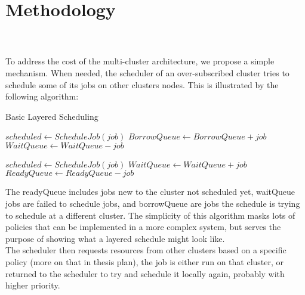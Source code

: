 \section{Methodology}

\\ \\ To address the cost of the multi-cluster architecture, we propose a simple mechanism. When needed, 
the scheduler of an over-subscribed cluster tries to schedule some of its jobs on other clusters nodes. 
This is illustrated by the following algorithm:

\begin{algorithm}
\caption{Basic Layered Scheduling}
\begin{algorithmic}
     
        \State $scheduled \gets ScheduleJob(job)$
        \State $BorrowQueue \gets BorrowQueue + job$
        \State $WaitQueue \gets WaitQueue - job$
        \EndIf
    \EndFor

     
        \State $scheduled \gets ScheduleJob(job)$
        \State $WaitQueue \gets WaitQueue + job$
        \State $ReadyQueue \gets ReadyQueue - job$
        \EndIf
    \EndFor
\end{algorithmic}
\end{algorithm}

The readyQueue includes jobs new to the cluster not scheduled yet, waitQueue jobs are failed to schedule jobs, 
and borrowQueue are jobs the schedule is trying to schedule at a different cluster. The simplicity of this algorithm masks 
lots of policies that can be implemented in a more complex system, but serves the purpose of showing what a layered schedule 
might look like.\\
The scheduler then requests resources from other clusters based on a specific policy (more on that in thesis plan), 
the job is either run on that cluster, or returned to the scheduler to try and schedule it locally again, probably with 
higher priority.

